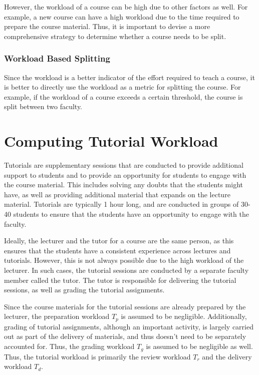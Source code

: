 However, the workload of a course can be high due to other factors as well. For example, a new course can have a high workload due to the time required to prepare the course material. Thus, it is important to devise a more comprehensive strategy to determine whether a course needs to be split.

\subsubsection{Workload Based Splitting}

Since the workload is a better indicator of the effort required to teach a course, it is better to directly use the workload as a metric for splitting the course. For example, if the workload of a course exceeds a certain threshold, the course is split between two faculty.


\section{Computing Tutorial Workload}

Tutorials are supplementary sessions that are conducted to provide additional support to students and to provide an opportunity for students to engage with the course material. This includes solving any doubts that the students might have, as well as providing additional material that expands on the lecture material. Tutorials are typically 1 hour long, and are conducted in groups of 30-40 students to ensure that the students have an opportunity to engage with the faculty.

Ideally, the lecturer and the tutor for a course are the same person, as this ensures that the students have a consistent experience across lectures and tutorials. However, this is not always possible due to the high workload of the lecturer. In such cases, the tutorial sessions are conducted by a separate faculty member called the tutor. The tutor is responsible for delivering the tutorial sessions, as well as grading the tutorial assignments.

Since the course materials for the tutorial sessions are already prepared by the lecturer, the preparation workload \(T_p\) is assumed to be negligible. Additionally, grading of tutorial assignments, although an important activity, is largely carried out as part of the delivery of materials, and thus doesn't need to be separately accounted for. Thus, the grading workload \(T_g\) is assumed to be negligible as well. Thus, the tutorial workload is primarily the review workload \(T_r\) and the delivery workload \(T_d\).

